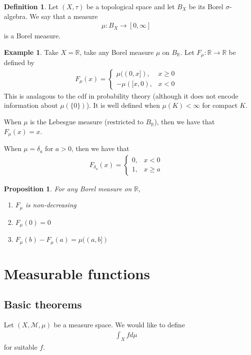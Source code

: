 \documentclass[11pt]{amsart}
\newtheorem{proposition}[theorem]{Proposition}
\theoremstyle{definition}
\newtheorem{definition}[theorem]{Definition}
\newtheorem{example}[theorem]{Example}
\numberwithin{equation}{section}
\begin{document}
\begin{definition}
    Let $(X,\tau)$ be a topological space and let $B_X$ be its Borel $\sigma$-algebra. We say that a measure
    \begin{align*}
        \mu:B_X\to[0,\infty]
    \end{align*}
    is a Borel measure.
\end{definition}
\begin{example}
    Take $X=\mathbb R$, take any Borel measure $\mu$ on $B_\mathbb R$. Let $F_\mu:\mathbb R\to\mathbb R$ be defined by
    \begin{align*}
        F_\mu(x)=\begin{cases}
            \mu((0,x]),&x\ge 0\\
            -\mu([x,0),&x<0
        \end{cases}
    \end{align*}
    This is analagous to the cdf in probability theory (although it does not encode information about $\mu(\{0\})$). It is well defined when $\mu(K)<\infty$ for compact $K$.

    When $\mu$ is the Lebesgue measure (restricted to $B_\mathbb R$), then we have that $F_\mu(x)=x$.

    When $\mu=\delta_a$ for $a>0$, then we have that
    \begin{align*}
        F_{\delta_a}(x)=\begin{cases}
            0, & x<0\\
            1, &x\ge a
        \end{cases}
    \end{align*}
\end{example}
\begin{proposition}
    For any Borel measure on $\mathbb R$,
    \begin{enumerate}
        \item [(i)] $F_\mu$ is non-decreasing
        \item [(ii)] $F_\mu(0)=0$
        \item [(iii)] $F_\mu(b)-F_\mu(a)=\mu((a,b])$
    \end{enumerate}
\end{proposition}
\newpage
\section{Measurable functions}
\subsection{Basic theorems}
Let $(X,\mathcal M,\mu)$ be a measure space. We would like to define
\begin{align*}
    \int_Xfd\mu
\end{align*}
for suitable $f$.
\end{document}
